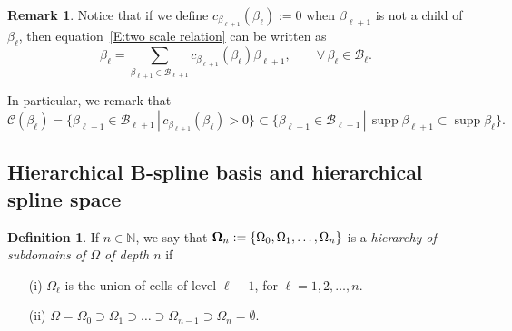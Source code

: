 \documentclass[12pt,a4paper,pdftex]{article}
\theoremstyle{plain}
\theoremstyle{definition}
\newtheorem{definition}[theorem]{Definition}
\newtheorem{remark}[theorem]{Remark}
\theoremstyle{remark}
\DeclareMathOperator{\supp}{supp}
\newcommand\NN{\mathbb N}
\newcommand\BB{\mathcal B}
\newcommand\CC{\mathcal C}
\begin{document}
\begin{remark}
Notice that if we define $c_{\beta_{\ell+1}}(\beta_\ell):=0$ when $\beta_{\ell+1}$ is not a child of $\beta_\ell$, then equation~\eqref{E:two scale relation} can be written as
\begin{equation}\label{E:two scale relation 2}
 \beta_\ell = \sum_{\beta_{\ell+1}\in\BB_{\ell+1}} 
c_{\beta_{\ell+1}}(\beta_\ell)\beta_{\ell+1}, 
\qquad \forall\,\beta_\ell\in\BB_\ell.
\end{equation}

In particular, we remark that
\begin{equation}\label{E:set of children}
\CC(\beta_\ell)=\{\beta_{\ell+1}\in\BB_{\ell+1}\,|\,c_{\beta_{\ell+1}}(\beta_\ell)>0\}\subset\{\beta_{\ell+1}\in\BB_{\ell+1}\,|\,\supp\beta_{\ell+1}\subset\supp\beta_\ell\}.
\end{equation}

\end{remark}

\subsection{Hierarchical B-spline basis and hierarchical spline space}

\begin{definition} 
If $n\in\NN$, 
we say that ${\bf\Omega}_n := \{\Omega_0,\Omega_1,\dots,\Omega_n\}$ is a 
\emph{hierarchy of subdomains of $\Omega$ of depth $n$} if
\begin{enumerate}
 \item[(i)] $\Omega_\ell$ is the union of cells of level 
$\ell-1$, for $\ell = 1,2,\dots,n$.
 \item[(ii)]$\Omega = \Omega_0 \supset \Omega_1 \supset \dots \supset 
\Omega_{n-1}\supset \Omega_n = \emptyset$.
\end{enumerate} 
\end{definition}
\end{document}
